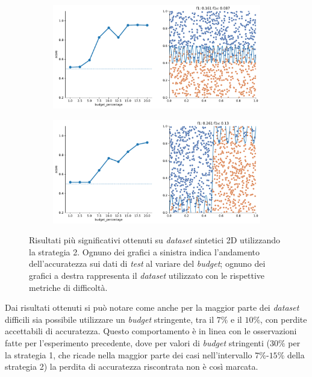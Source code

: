 \begin{figure}
\begin{subfigure}{.5\textwidth}
    \end{subfigure}%
    \hfill
    \begin{subfigure}{.5\textwidth}
        \centering
        \includegraphics[width=\textwidth]{img/2d_v2/14.pdf}
    \end{subfigure}
    \begin{subfigure}{.5\textwidth}
        \centering
        \includegraphics[width=\textwidth]{img/2d_v2/15.pdf}
    \end{subfigure}%
\caption[Risultati su \emph{dataset} sintetici utilizzando la strategia 2.]{Risultati più significativi ottenuti su \emph{dataset} sintetici 2D utilizzando la strategia 2. Ognuno dei grafici a sinistra indica l'andamento dell'accuratezza sui dati di \emph{test} al variare del \emph{budget}; ognuno dei grafici a destra rappresenta il \emph{dataset} utilizzato con le rispettive metriche di difficoltà.}
\label{fig:2d_v2}
\end{figure}
Dai risultati ottenuti si può notare come anche per la maggior parte dei \emph{dataset} difficili sia possibile utilizzare un \emph{budget} stringente, tra il $7\%$ e il $10\%$, con perdite accettabili di accuratezza.
Questo comportamento è in linea con le osservazioni fatte per l'esperimento precedente, dove per valori di \emph{budget} stringenti ($30\%$ per la strategia 1, che ricade nella maggior parte dei casi nell'intervallo $7\%$-$15\%$ della strategia 2) la perdita di accuratezza riscontrata non è così marcata.


